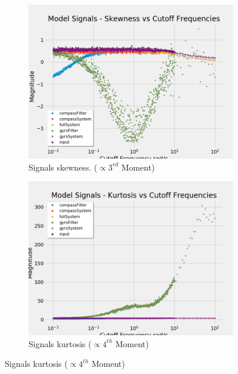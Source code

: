 \begin{figure}[H]
\begin{subfigure}{.5\textwidth}
\end{subfigure}
\begin{subfigure}{.5\textwidth}
  \centering
  \includegraphics[width=\linewidth, height=\paperheight/5]{img/iterable/modelSignals/modelskewnessSignals.png}  
  \caption{Signals skewness. ($\propto3^{rd}$ Moment)}
  \label{fig:model_skewness}
\end{subfigure}
\begin{subfigure}{.5\textwidth}
  \centering
  \includegraphics[width=\linewidth, height=\paperheight/5]{img/iterable/modelSignals/modelkurtosisSignals.png}  
  \caption{Signals kurtosis ($\propto4^{th}$ Moment)}
  \label{fig:model_kurtosis}
\end{subfigure}

\end{figure}
